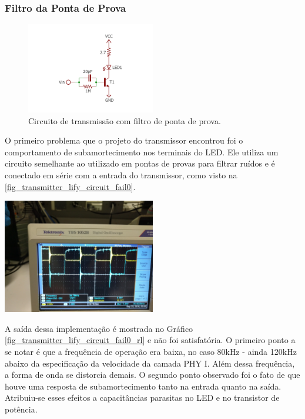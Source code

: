 	\subsubsection{Filtro da Ponta de Prova}
	\begin{figure}[h]
		\caption{\label{fig_transmitter_lify_circuit_fail0}Circuito de transmissão com filtro de ponta de prova.}
		\centering		%
		\includegraphics[width=0.5\textwidth, trim={2cm 1cm 2cm 2cm}, clip]{circuits/transmitter_fail0.pdf}
	\end{figure}
	O primeiro problema que o projeto do transmissor encontrou foi o comportamento de subamortecimento nos terminais do LED. Ele utiliza um circuito semelhante ao utilizado em pontas de provas para filtrar ruídos e é conectado em série com a entrada do transmissor, como visto na \autoref{fig_transmitter_lify_circuit_fail0}.
	\begin{chart}[h]
		\caption{\label{fig_transmitter_lify_circuit_fail0_rl}Comportamento do circuito de transmissão com filtro de ponta de prova em série com a entrada. A onda azul é saída do gerador de funções enquanto a onda amarela é a tensão submetida ao LED. Observa-se o comportamento de subamortecimento em ambas.}
		\centering		%
		\includegraphics[width=0.5\textwidth, trim={30cm 0cm 2cm 40cm}, clip]{circuits/photos/TX_probe_result.jpg}
	\end{chart}

	A saída dessa implementação é mostrada no Gráfico \ref{fig_transmitter_lify_circuit_fail0_rl} e não foi satisfatória. O primeiro ponto a se notar é que a frequência de operação era baixa, no caso 80kHz - ainda 120kHz abaixo da especificação da velocidade da camada PHY I. Além dessa frequência, a forma de onda se distorcia demais. O segundo ponto observado foi o fato de que houve uma resposta de subamortecimento tanto na entrada quanto na saída. Atribuiu-se esses efeitos a capacitâncias parasitas no LED e no transistor de potência.
	
